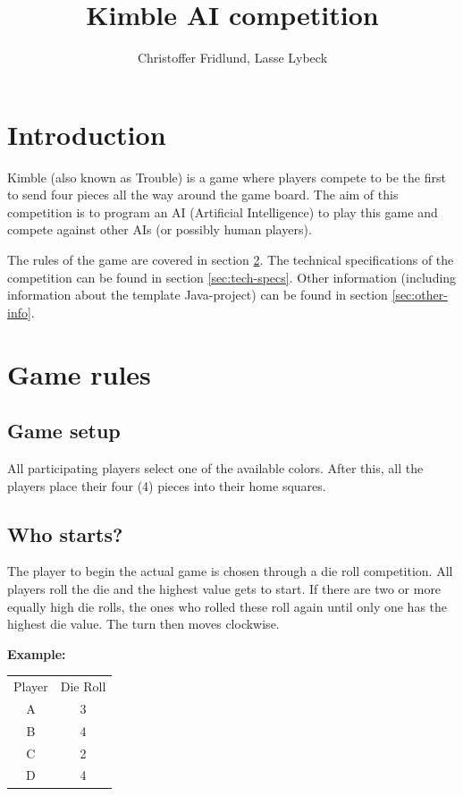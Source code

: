 \documentclass[10pt,a4paper]{article}
\author{Christoffer Fridlund, Lasse Lybeck}
\title{Kimble AI competition}
\begin{document}
\maketitle

\tableofcontents


\section{Introduction}

Kimble (also known as Trouble) is a game where players compete to be the first to send four pieces all the way around the game board. The aim of this competition is to program an AI (Artificial Intelligence) to play this game and compete against other AIs (or possibly human players).

The rules of the game are covered in section \ref{sec:rules}. The technical specifications of the competition can be found in section \ref{sec:tech-specs}. Other information (including information about the template Java-project) can be found in section \ref{sec:other-info}.


\section{Game rules}
\label{sec:rules}

\subsection{Game setup}

All participating players select one of the available colors. After this, all the players place their four (4) pieces into their home squares.

\subsection{Who starts?}

The player to begin the actual game is chosen through a die roll competition. All players roll the die and the highest value gets to start. If there are two or more equally high die rolls, the ones who rolled these roll again until only one has the highest die value. The turn then moves clockwise.

\textbf{Example:}

\begin{tabular}{c c}
	Player & Die Roll \\
	A & 3 \\
	B & 4 \\
	C & 2 \\
	D & 4
\end{tabular}
\end{document}
